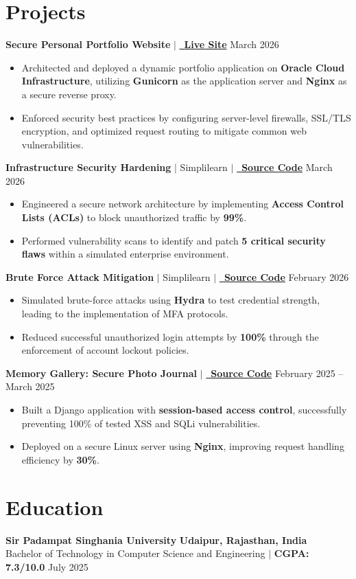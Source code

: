 \documentclass[10pt,a4paper,sans]{article}
\begin{document}

\section{Projects}

\noindent \textbf{Secure Personal Portfolio Website} $|$ 
\href{https://prashantpal.online}{\faLink\ \textbf{Live Site}}
\hfill March 2026
\begin{itemize}
    \item Architected and deployed a dynamic portfolio application on \textbf{Oracle Cloud Infrastructure}, utilizing \textbf{Gunicorn} as the application server and \textbf{Nginx} as a secure reverse proxy.
    \item Enforced security best practices by configuring server-level firewalls, SSL/TLS encryption, and optimized request routing to mitigate common web vulnerabilities.
\end{itemize}

\noindent \textbf{Infrastructure Security Hardening} $|$ {Simplilearn} $|$
\href{https://github.com/prashantpal8980/Enterprise-Infrastructure-Security-Hardening.git}{\faGithub\ \textbf{Source Code}}
\hfill March 2026
\begin{itemize}
    \item Engineered a secure network architecture by implementing \textbf{Access Control Lists (ACLs)} to block unauthorized traffic by \textbf{99\%}.
    \item Performed vulnerability scans to identify and patch \textbf{5 critical security flaws} within a simulated enterprise environment.
\end{itemize}

\noindent \textbf{Brute Force Attack Mitigation} $|$ {Simplilearn} $|$
\href{https://github.com/prashantpal8980/Brute-Force-Attack-Detection-and-Mitigation.git}{\faGithub\ \textbf{Source Code}}
\hfill February 2026
\begin{itemize}
    \item Simulated brute-force attacks using \textbf{Hydra} to test credential strength, leading to the implementation of MFA protocols.
    \item Reduced successful unauthorized login attempts by \textbf{100\%} through the enforcement of account lockout policies.
\end{itemize}

\noindent \textbf{Memory Gallery: Secure Photo Journal} $|$
\href{https://github.com/prashantpal8980/MemoryGallery.git}{\faGithub\ \textbf{Source Code}} \hfill February 2025 -- March 2025
\begin{itemize}
    \item Built a Django application with \textbf{session-based access control}, successfully preventing 100\% of tested XSS and SQLi vulnerabilities.
    \item Deployed on a secure Linux server using \textbf{Nginx}, improving request handling efficiency by \textbf{30\%}.
\end{itemize}

\section{Education}
\noindent \textbf{Sir Padampat Singhania University} \hfill \textbf{Udaipur, Rajasthan, India} \\
Bachelor of Technology in Computer Science and Engineering $|$ \textbf{CGPA: 7.3/10.0} \hfill July 2025
\end{document}
